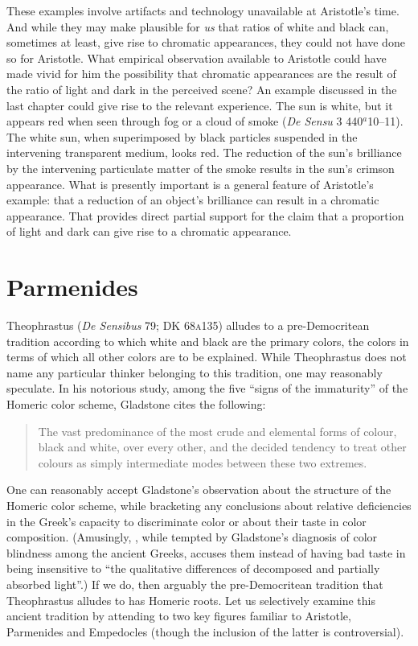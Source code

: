 These examples involve artifacts and technology unavailable at Aristotle's time. And while they may make plausible for \emph{us} that ratios of white and black can, sometimes at least, give rise to chromatic appearances, they could not have done so for Aristotle. What empirical observation available to Aristotle could have made vivid for him the possibility that chromatic appearances are the result of the ratio of light and dark in the perceived scene? An example discussed in the last chapter could give rise to the relevant experience. The sun is white, but it appears red when seen through fog or a cloud of smoke (\emph{De Sensu} 3 440\( ^{a} \)10--11).  The white sun, when superimposed by black particles suspended in the intervening transparent medium, looks red. The reduction of the sun's brilliance by the intervening particulate matter of the smoke results in the sun's crimson appearance. What is presently important is a general feature of Aristotle's example: that a reduction of an object's brilliance  can result in a chromatic appearance. That provides direct partial support for the claim that a proportion of light and dark can give rise to a chromatic appearance.


\section{Parmenides} %
\label{sec:parmenides}
Theophrastus (\emph{De Sensibus} 79; DK 68\textsc{a}135) alludes to a pre-Democritean tradition according to which white and black are the primary colors, the colors in terms of which all other colors are to be explained. While Theophrastus does not name any particular thinker belonging to this tradition, one may reasonably speculate. In his notorious study, among the five ``signs of the immaturity'' of the Homeric color scheme, Gladstone cites the following:  
\begin{quote}
    The vast predominance of the most crude and elemental forms of colour, black and white, over every other, and the decided tendency to treat other colours as simply intermediate modes between these two extremes. \citep[458]{Gladstone:1858fk}
\end{quote}
One can reasonably accept Gladstone's observation about the structure of the Ho\-meric color scheme, while bracketing any conclusions about relative deficiencies in the Greek's capacity to discriminate color or about their taste in color composition. (Amusingly, \citealt[162]{Platnauer:1921bh}, while tempted by Gladstone's diagnosis of color blindness among the ancient Greeks, accuses them instead of having bad taste in being insensitive to ``the qualitative differences of decomposed and partially absorbed light''.) If we do, then arguably the pre-De\-mo\-cri\-tean tradition that Theophrastus alludes to has Homeric roots. Let us selectively examine this ancient tradition by attending to two key figures familiar to Aristotle, Parmenides and Empedocles (though the inclusion of the latter is controversial).

